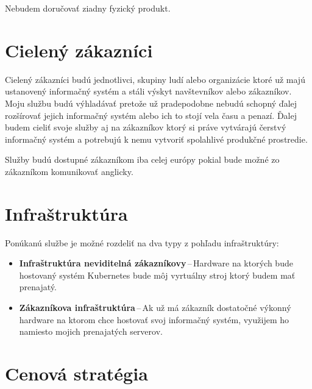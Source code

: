 Nebudem doručovať ziadny fyzický produkt.

\section{Cielený zákazníci}

Cielený zákazníci budú jednotlivci, skupiny ludí alebo organizácie ktoré už majú ustanovený informačný systém a stáli výskyt navštevníkov alebo zákazníkov. Moju službu budú výhladávať pretože už pradepodobne nebudú schopný ďalej rozšírovať jejich informačný systém alebo ich to stojí vela času a penazí. Ďalej budem cieliť svoje služby aj na zákazníkov ktorý si práve vytvárajú čerstvý informačný systém a potrebujú k nemu vytvoriť spolahlivé produkčné prostredie.

Služby budú dostupné zákazníkom iba celej európy pokial bude možné zo zákazníkom komunikovať anglicky.

\section{Infraštruktúra}

Ponúkanú službe je možné rozdeliť na dva typy z pohľadu infraštruktúry:
\begin{itemize}
  \item \textbf{Infraštruktúra neviditelná zákazníkovy}\,--\,Hardware na ktorých bude hostovaný systém Kubernetes bude môj vyrtuálny stroj ktorý budem mať prenajatý.
  \item \textbf{Zákazníkova infraštruktúra}\,--\,Ak už má zákazník dostatočné výkonný hardware na ktorom chce hostovať svoj informačný systém, využijem ho namiesto mojich prenajatých serverov.
\end{itemize}

\section{Cenová stratégia}




